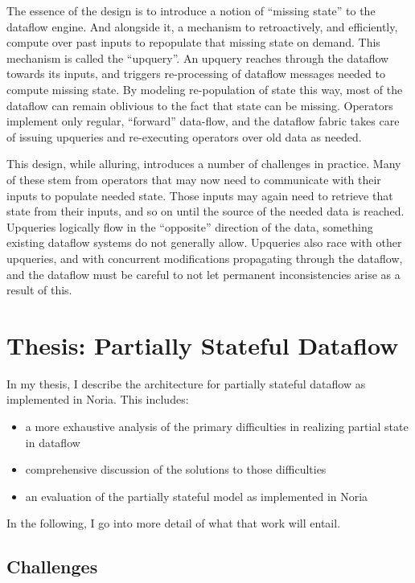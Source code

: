 \documentclass[12pt,letterpaper,twoside]{article}
\begin{document}
The essence of the design is to introduce a notion of ``missing state'' to the
dataflow engine. And alongside it, a mechanism to retroactively, and
efficiently, compute over past inputs to repopulate that missing state on
demand. This mechanism is called the ``upquery''. An upquery reaches through the
dataflow towards its inputs, and triggers re-processing of dataflow messages
needed to compute missing state. By modeling re-population of state this way,
most of the dataflow can remain oblivious to the fact that state can be missing.
Operators implement only regular, ``forward'' data-flow, and the dataflow fabric
takes care of issuing upqueries and re-executing operators over old data as
needed.

This design, while alluring, introduces a number of challenges in practice. Many
of these stem from operators that may now need to communicate with their inputs
to populate needed state. Those inputs may again need to retrieve that state
from their inputs, and so on until the source of the needed data is reached.
Upqueries logically flow in the ``opposite'' direction of the data, something
existing dataflow systems do not generally allow. Upqueries also race with other
upqueries, and with concurrent modifications propagating through the dataflow,
and the dataflow must be careful to not let permanent inconsistencies arise as a
result of this.

\section{Thesis: Partially Stateful Dataflow}

In my thesis, I describe the architecture for partially stateful dataflow as
implemented in Noria. This includes:

\begin{itemize}

 \item a more exhaustive analysis of the primary difficulties in realizing
	 partial state in dataflow
 \item comprehensive discussion of the solutions to those difficulties
 \item an evaluation of the partially stateful model as implemented in Noria
\end{itemize}

In the following, I go into more detail of what that work will entail.

\subsection{Challenges}
\label{s:challenges}
\end{document}

